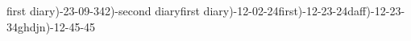 first diary)-23-09-342)-second diaryfirst diary)-12-02-24first)-12-23-24daff)-12-23-34ghdjn)-12-45-45